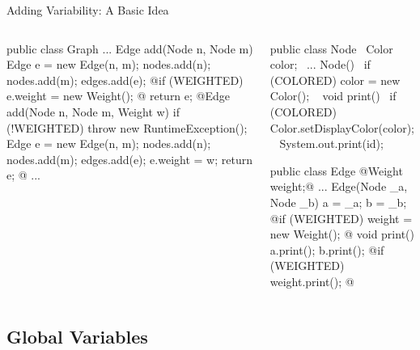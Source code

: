 \begin{frame}[fragile]{Adding Variability: A Basic Idea}
		\begin{columns}
				\vspace{5mm}
\begin{tiny}
\begin{codetight}{}
public class Graph {
	...
	Edge add(Node n, Node m) {
		Edge e = new Edge(n, m);
		nodes.add(n); nodes.add(m); edges.add(e);
		@if (WEIGHTED) { e.weight = new Weight(); }@
		return e;
	}
	@Edge add(Node n, Node m, Weight w) {
		if (!WEIGHTED) { throw new RuntimeException(); }
		Edge e = new Edge(n, m);
		nodes.add(n); nodes.add(m); edges.add(e);
		e.weight = w;
		return e;
	}@
	...
}
\end{codetight}
\end{tiny}	
\begin{tiny}
\begin{codetight}{}
public class Node {
	~Color color;~
	...
	Node(){
		~if (COLORED) { color = new Color(); }~
	}
	void print() {
		~if (COLORED) { Color.setDisplayColor(color); }~
		System.out.print(id);
	}
}
\end{codetight}
\begin{codetight}{}
public class Edge {
	@Weight weight;@ 
	...
	Edge(Node _a, Node _b) {
		a = _a; b = _b;
		@if (WEIGHTED) { weight = new Weight(); }@
	}
	void print() {
		a.print(); b.print();
		@if (WEIGHTED) { weight.print(); }@
	}
}
\end{codetight}
\end{tiny}	
		\end{columns}
\end{frame}

\subsection{Global Variables}

